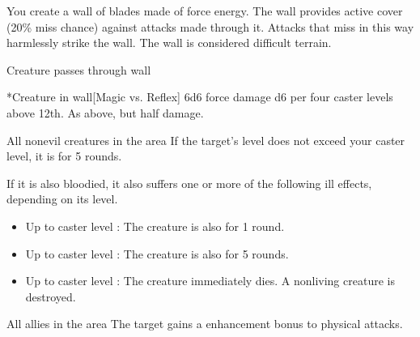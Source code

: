 \spellrng{\rngmed}
\spelldur{\durshort \dismissable}
\spellline
\spelleffect You create a wall of blades made of force energy. The wall provides active cover (20\% miss chance) against attacks made through it. Attacks that miss in this way harmlessly strike the wall. The wall is considered difficult terrain.
\begin{spelltrigger}{Creature passes through wall}
    \begin{spelltargets}*{Creature in wall}[Magic vs. Reflex]
        \spellsuccess 6d6 force damage \add d6 per four caster levels above 12th.
        \spellfailure As above, but half damage.
    \end{spelltargets}
\end{spelltrigger}

\begin{spelltargets}{All nonevil creatures in the area}
    \spelleffect If the target's level does not exceed your caster level, it is \sickened for 5 rounds.

    If it is also bloodied, it also suffers one or more of the following ill effects, depending on its level.
    \begin{itemize}
        \item Up to caster level : The creature is also \nauseated for 1 round.
        \item Up to caster level : The creature is also \paralyzed for 5 rounds.
        \item Up to caster level : The creature immediately dies. A nonliving creature is destroyed.
    \end{itemize}
\end{spelltargets}

\begin{spelltargets}{All allies in the area}
    \spelleffect The target gains a  enhancement bonus to physical attacks. \spellbonusscalingdescription
\end{spelltargets}

